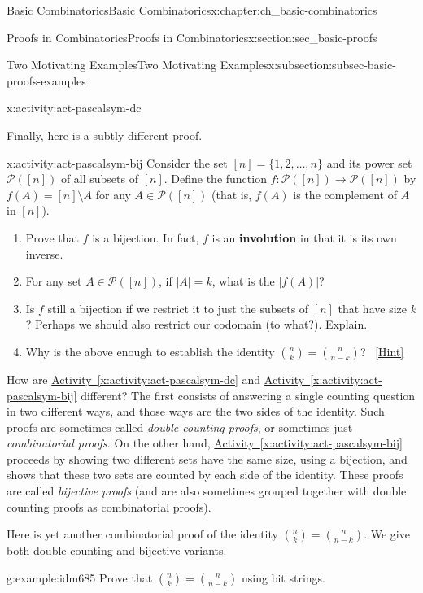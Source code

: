 \documentclass[oneside,10pt,]{book}
\newcommand{\terminology}[1]{\textbf{#1}}
\numberwithin{equation}{chapter}
\def\pow{\mathcal P}
\newcommand{\card}[1]{\left| #1 \right|}
\begin{document}
\begin{chapterptx}{Basic Combinatorics}{}{Basic Combinatorics}{}{}{x:chapter:ch_basic-combinatorics}
\begin{sectionptx}{Proofs in Combinatorics}{}{Proofs in Combinatorics}{}{}{x:section:sec_basic-proofs}
\begin{subsectionptx}{Two Motivating Examples}{}{Two Motivating Examples}{}{}{x:subsection:subsec-basic-proofs-examples}
\begin{activity}{}{x:activity:act-pascalsym-dc}
\begin{enumerate}[font=\bfseries,label=(\alph*),ref=\alph*]
\end{enumerate}
\end{activity}
Finally, here is a subtly different proof.%
\begin{activity}{}{x:activity:act-pascalsym-bij}%
Consider the set \([n] = \{1,2,\ldots,n\}\) and its power set \(\pow([n])\) of all subsets of \([n]\).  Define the function \(f:\pow([n]) \to \pow([n])\) by \(f(A) = [n]\setminus A\) for any \(A \in \pow([n])\) (that is, \(f(A)\) is the complement of \(A\) in \([n]\)).%
\begin{enumerate}[font=\bfseries,label=(\alph*),ref=\alph*]
\item{}Prove that \(f\) is a bijection.  In fact, \(f\) is an \terminology{involution} in that it is its own inverse.%
\item{}For any set \(A \in \pow([n])\), if \(\card{A} = k\), what is the \(\card{f(A)}\)?%
\item{}Is \(f\) still a bijection if we restrict it to just the subsets of \([n]\) that have size \(k\)?  Perhaps we should also restrict our codomain (to what?).  Explain.%
\item{}Why is the above enough to establish the identity \(\binom{n}{k} = \binom{n}{n-k}\)?%
\qquad~\hfill{\tiny\hyperlink{g:hint:idm671-back}{[Hint]}}\end{enumerate}
\end{activity}
How are \hyperref[x:activity:act-pascalsym-dc]{Activity~\ref{x:activity:act-pascalsym-dc}} and \hyperref[x:activity:act-pascalsym-bij]{Activity~\ref{x:activity:act-pascalsym-bij}} different?  The first consists of answering a single counting question in two different ways, and those ways are the two sides of the identity.  Such proofs are sometimes called \emph{double counting proofs}, or sometimes just \emph{combinatorial proofs}.  On the other hand, \hyperref[x:activity:act-pascalsym-bij]{Activity~\ref{x:activity:act-pascalsym-bij}} proceeds by showing two different sets have the same size, using a bijection, and shows that these two sets are counted by each side of the identity.  These proofs are called \emph{bijective proofs} (and are also sometimes grouped together with double counting proofs as combinatorial proofs).%
\par
Here is yet another combinatorial proof of the identity \(\binom{n}{k} = \binom{n}{n-k}\).  We give both double counting and bijective variants.%
\begin{example}{}{g:example:idm685}%
Prove that \(\binom{n}{k} = \binom{n}{n-k}\) using bit strings.%
\par\smallskip%

\end{example}
\end{subsectionptx}
\end{sectionptx}
\end{chapterptx}
\end{document}
